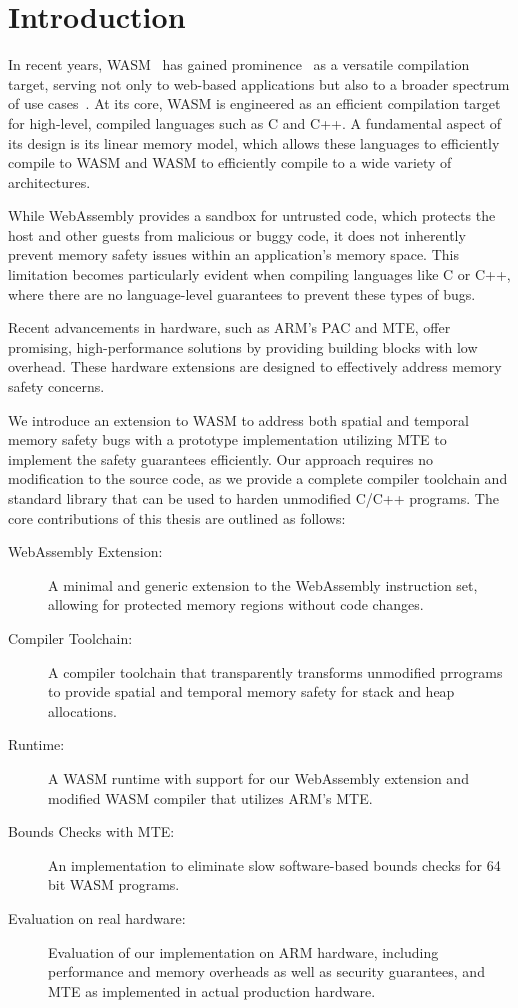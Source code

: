 \chapter{Introduction}
\label{ch:intro}

In recent years, \ac{WASM}~\cite{haas2017bringing} has gained prominence~\cite{musch2019new} as a versatile compilation target, serving not only to web-based applications but also to a broader spectrum of use cases~\cite{wasm_use_cases}.
At its core, \ac{WASM} is engineered as an efficient compilation target for high-level, compiled languages such as C and C++.
A fundamental aspect of its design is its linear memory model, which allows these languages to efficiently compile to \ac{WASM} and \ac{WASM} to efficiently compile to a wide variety of architectures.

While WebAssembly provides a sandbox for untrusted code, which protects the host and other guests from malicious or buggy code, it does not inherently prevent memory safety issues within an application's memory space.
This limitation becomes particularly evident when compiling languages like C or C++, where there are no language-level guarantees to prevent these types of bugs.

Recent advancements in hardware, such as ARM's \ac{PAC} and \acf{MTE}, offer promising, high-performance solutions by providing building blocks with low overhead.
These hardware extensions are designed to effectively address memory safety concerns.

We introduce an extension to \ac{WASM} to address both spatial and temporal memory safety bugs with a prototype implementation utilizing \ac{MTE} to implement the safety guarantees efficiently.
Our approach requires no modification to the source code, as we provide a complete compiler toolchain and standard library that can be used to harden unmodified C/C++ programs.
The core contributions of this thesis are outlined as follows:

\begin{description}
    \item[WebAssembly Extension:] A minimal and generic extension to the WebAssembly instruction set, allowing for protected memory regions without code changes.
    \item[Compiler Toolchain:] A compiler toolchain that transparently transforms unmodified prrograms to provide spatial and temporal memory safety for stack and heap allocations.
    \item[Runtime:] A \ac{WASM} runtime with support for our WebAssembly extension and modified \ac{WASM} compiler that utilizes ARM's \ac{MTE}.
    \item[Bounds Checks with \ac{MTE}:] An implementation to eliminate slow software-based bounds checks for 64\,bit \ac{WASM} programs.
    \item[Evaluation on real hardware:] Evaluation of our implementation on ARM hardware, including performance and memory overheads as well as security guarantees, and \ac{MTE} as implemented in actual production hardware.
\end{description}
